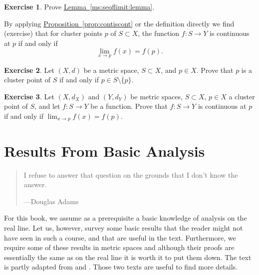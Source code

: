 \documentclass[12pt,openany]{book}
\theoremstyle{plain}
\theoremstyle{remark}
\theoremstyle{definition}
\newenvironment{exbox}{%
    \def\FrameCommand{\vrule width 1pt \relax\hspace{10pt}}%
    \MakeFramed{\advance\hsize-\width\FrameRestore}%
}{%
    \endMakeFramed
}
\newenvironment{myepigraph}{%
    \begin{quote}%
    \begingroup\itshape
}{%
    \endgroup%
    \end{quote}
}
\theoremstyle{exercise}
\newtheorem{exercise}{Exercise}[section]
\theoremstyle{example}
\newcommand{\propref}[1]{\hyperref[#1]{Proposition~\ref*{#1}}}
\newcommand{\lemmaref}[1]{\hyperref[#1]{Lemma~\ref*{#1}}}
\begin{document}
\begin{exbox}
\begin{exercise}
Prove \lemmaref{ms:seqflimit:lemma}.
\end{exercise}
\end{exbox}

By applying \propref{prop:contiscont} or the definition directly we find
(exercise) that for cluster points $p$ of $S
\subset X$, the function
$f \colon S \to Y$ is continuous at $p$ if and only if
\begin{equation*}
\lim_{x \to p} f(x) = f(p) .
\end{equation*}

\begin{exbox}
\begin{exercise}
Let $(X,d)$ be a metric space, $S \subset X$, and $p \in X$.  Prove that
$p$ is a cluster point of $S$ if and only if $p \in \overline{S \setminus \{
p \}}$.
\end{exercise}

\begin{exercise}
Let $(X,d_X)$ and $(Y,d_Y)$ be metric spaces, $S \subset X$, $p \in X$
a cluster point of $S$, and let $f \colon S \to Y$ be a function.
Prove that
$f \colon S \to Y$ is continuous at $p$ if and only if
$\lim_{x \to p} f(x) = f(p)$.
\end{exercise}
\end{exbox}


\chapter{Results From Basic Analysis} \label{ap:basicanal}

\begin{myepigraph}
I refuse to answer that question on the grounds that I don't know the
answer.

---Douglas Adams
\end{myepigraph}

For this book,
we assume as a prerequisite a basic knowledge of analysis on the real line.
Let us, however, survey some basic results that the reader might not have
seen in such a course, and that are useful in the text.  Furthermore,
we require some of these results in metric spaces and although their proofs
are essentially the same as on the real line it is worth it to put them down.
The text is partly adapted from \cite{ra:book} and \cite{ra:book2}.
Those two texts are useful to find more details.
\end{document}
